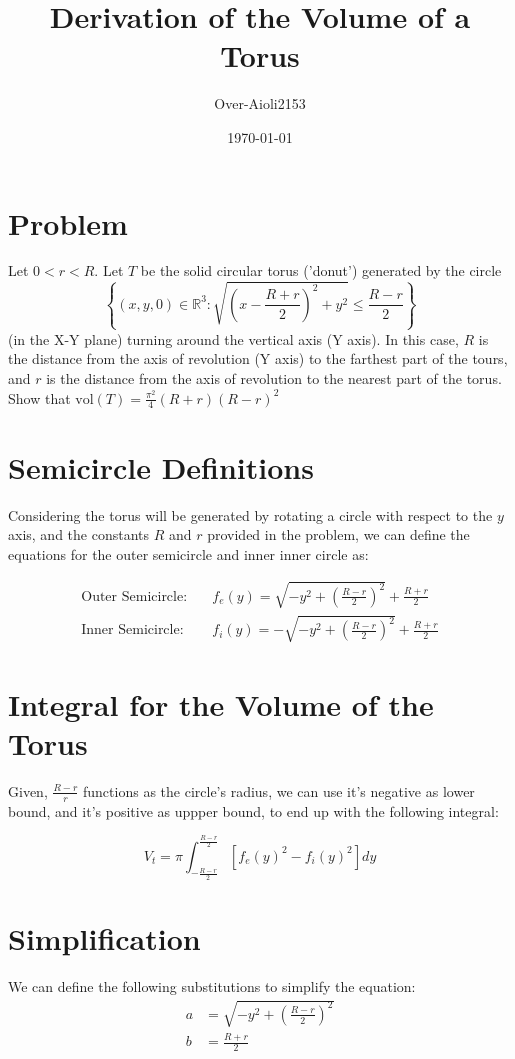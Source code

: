 \documentclass{article}
\title{Derivation of the Volume of a Torus}
\author{Over-Aioli2153}
\date{\today}
\begin{document}
	
	\maketitle
	\section*{Problem}
	Let $0<r<R$. Let $T$ be the solid circular torus ('donut') generated by the circle
	\[\left\{(x,y,0)\in \mathbb{R}^3:\sqrt{\left(x-\frac{R+r}{2}\right)^2+y^2}\leq\frac{R-r}{2}\right\}\]
	(in the X-Y plane) turning around the vertical axis (Y axis). In this case, $R$ is the distance from the axis of revolution (Y axis) to the farthest part of the tours, and $r$ is the distance from the axis of revolution to the nearest part of the torus. Show that $\text{vol}(T)=\frac{\pi^2}{4}(R+r)(R-r)^2$
	\section*{Semicircle Definitions}
	Considering the torus will be generated by rotating a circle with respect to the $y$ axis, and the constants $R$ and $r$ provided in the problem, we can define the equations for the outer semicircle and inner inner circle as:
	
	\begin{align*}
		\text{Outer Semicircle:} & \quad f_e(y) = \sqrt{-y^{2} + \left(\frac{R-r}{2}\right)^{2}} + \frac{R+r}{2} \\
		\text{Inner Semicircle:} & \quad  f_i(y) = -\sqrt{-y^{2} + \left(\frac{R-r}{2}\right)^{2}} + \frac{R+r}{2}
	\end{align*}
	
	\section*{Integral for the Volume of the Torus}
	Given, $\frac{R-r}{r}$ functions as the circle's radius, we can use it's negative as lower bound, and it's positive as uppper bound, to end up with the following integral:
	
	\begin{equation}
		V_t = \pi \int_{-\frac{R-r}{2}}^{\frac{R-r}{2}} \left[ f_e(y)^2 - f_i(y)^2 \right] dy
	\end{equation}
	
	\section*{Simplification}
	We can define the following substitutions to simplify the equation:
	\begin{align*}
		a &= \sqrt{-y^{2} + \left(\frac{R-r}{2}\right)^{2}} \\
		b &= \frac{R+r}{2}
	\end{align*}
	
\end{document}
